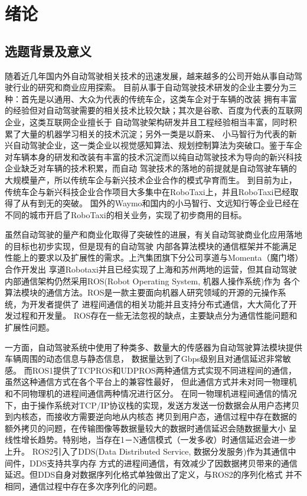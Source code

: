 \chapter{绪论}
\section{选题背景及意义}
随着近几年国内外自动驾驶相关技术的迅速发展，越来越多的公司开始从事自动驾驶行业的研究和商业应用探索\cite{qiuwei}。
目前从事于自动驾驶技术研发的企业主要分为三种：首先是以通用、大众为代表的传统车企，这类车企对于车辆的改装
拥有丰富的经验但对自动驾驶需要的相关技术比较欠缺；其次是谷歌、百度为代表的互联网企业，这类互联网企业擅长于
自动驾驶架构研发并且工程经验相当丰富，同时积累了大量的机器学习相关的技术沉淀；另外一类是以蔚来、
小马智行为代表的新兴自动驾驶企业，这一类企业以视觉感知算法、规划控制算法为突破口\cite{xiaoxi}。鉴于车企
对车辆本身的研发和改装有丰富的技术沉淀而以纯自动驾驶技术为导向的新兴科技企业缺乏对车辆的技术积累，而自动
驾驶技术的落地的前提就是自动驾驶车辆的大规模量产，所以传统车企与新兴技术企业合作的模式孕育而生\cite{yty}。
到目前为止，传统车企与新兴科技企业合作项目大多集中在RoboTaxi上，并且RoboTaxi已经取得了从有到无的突破。
国外的Waymo和国内的小马智行、文远知行等企业已经在不同的城市开启了RoboTaxi的相关业务，实现了初步商用的目标\cite{xmh}。

虽然自动驾驶的量产和商业化取得了突破性的进展，有关自动驾驶商业化应用落地的目标也初步实现，但是现有的自动驾驶
内部各算法模块的通信框架并不能满足性能上的要求以及扩展性的需求。上汽集团旗下分公司享道与Momenta（魔门塔）合作开发出
享道Robotaxi并且已经实现了上海和苏州两地的运营，但其自动驾驶内部通信架构仍然采用ROS(Robot Operating System, 机器人操作系统)作为
各个算法模块的通信方法\cite{zzq}。ROS是一款主要面向机器人研究领域的开源的元操作系统，为开发者提供了
进程间通信的相关功能并且支持分布式通信，大大简化了开发过程和开发量。
ROS存在一些无法忽视的缺点，主要缺点分为通信性能问题和扩展性问题\cite{9545285}。

一方面，自动驾驶系统中使用了种类多、数量大的传感器为自动驾驶算法模块提供车辆周围的动态信息与静态信息，
数据量达到了Gbps级别且对通信延迟非常敏感。
而ROS1提供了TCPROS和UDPROS两种通信方式实现不同进程间的通信，虽然这种通信方式在各个平台上的兼容性最好，
但此通信方式并未对同一物理机和不同物理机的进程间通信两种情况进行区分。
在同一物理机进程间通信的情况下，由于操作系统对TCP/IP协议栈的实现，发送方发送一份数据会从用户态拷贝到内核态，而接收方需要逆向地从内核态
拷贝到用户态，通信过程中存在数据的额外拷贝的问题，在传输图像等数据量较大的数据时通信延迟会随数据量大小
呈线性增长趋势。特别地，当存在1－N通信模式（一发多收）时通信延迟会进一步上升\cite{9591166,Maruyama2016ExploringTP}。
ROS2引入了DDS(Data Distributed Service, 数据分发服务)作为其通信中间件\cite{8607261}，DDS支持共享内存
方式的进程间通信，有效减少了因数据拷贝带来的通信延迟。但DDS自身对数据序列化格式单独做出了定义，与ROS2的序列化格式
并不相同，通信过程中存在多次序列化的问题\cite{Maruyama2016ExploringTP}。

